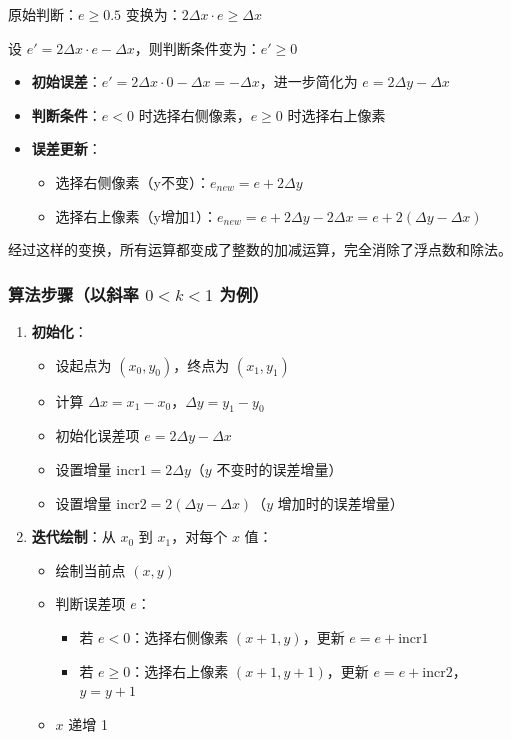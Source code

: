 \documentclass[12pt,a4paper]{article}
\begin{document}
\begin{tcolorbox}
原始判断：$e \geq 0.5$ 变换为：$2\Delta x \cdot e \geq \Delta x$

设 $e' = 2\Delta x \cdot e - \Delta x$，则判断条件变为：$e' \geq 0$

\begin{itemize}
    \item \textbf{初始误差}：$e' = 2\Delta x \cdot 0 - \Delta x = -\Delta x$，进一步简化为 $e = 2\Delta y - \Delta x$
    \item \textbf{判断条件}：$e < 0$ 时选择右侧像素，$e \geq 0$ 时选择右上像素
    \item \textbf{误差更新}：
    \begin{itemize}
        \item 选择右侧像素（y不变）：$e_{new} = e + 2\Delta y$
        \item 选择右上像素（y增加1）：$e_{new} = e + 2\Delta y - 2\Delta x = e + 2(\Delta y - \Delta x)$
    \end{itemize}
\end{itemize}

经过这样的变换，所有运算都变成了整数的加减运算，完全消除了浮点数和除法。

\subsubsection*{算法步骤（以斜率 $0 < k < 1$ 为例）}

\begin{enumerate}
    \item \textbf{初始化}：
    \begin{itemize}
        \item 设起点为 $(x_0, y_0)$，终点为 $(x_1, y_1)$
        \item 计算 $\Delta x = x_1 - x_0$，$\Delta y = y_1 - y_0$
        \item 初始化误差项 $e = 2\Delta y - \Delta x$
        \item 设置增量 $\text{incr1} = 2\Delta y$（$y$ 不变时的误差增量）
        \item 设置增量 $\text{incr2} = 2(\Delta y - \Delta x)$（$y$ 增加时的误差增量）
    \end{itemize}
    
    \item \textbf{迭代绘制}：从 $x_0$ 到 $x_1$，对每个 $x$ 值：
    \begin{itemize}
        \item 绘制当前点 $(x, y)$
        \item 判断误差项 $e$：
        \begin{itemize}
            \item 若 $e < 0$：选择右侧像素 $(x+1, y)$，更新 $e = e + \text{incr1}$
            \item 若 $e \geq 0$：选择右上像素 $(x+1, y+1)$，更新 $e = e + \text{incr2}$，$y = y + 1$
        \end{itemize}
        \item $x$ 递增 1
    \end{itemize}
    

\end{enumerate}
\end{tcolorbox}
\end{document}
